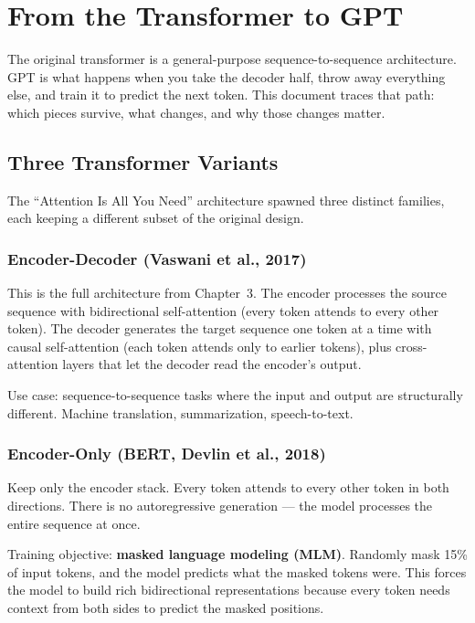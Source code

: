 \chapter{From the Transformer to GPT}

The original transformer is a general-purpose sequence-to-sequence architecture. GPT is what happens when you take the decoder half, throw away everything else, and train it to predict the next token. This document traces that path: which pieces survive, what changes, and why those changes matter.

\section{Three Transformer Variants}

The ``Attention Is All You Need'' architecture spawned three distinct families, each keeping a different subset of the original design.

\subsection{Encoder-Decoder (Vaswani et al., 2017)}

This is the full architecture from Chapter~3. The encoder processes the source sequence with bidirectional self-attention (every token attends to every other token). The decoder generates the target sequence one token at a time with causal self-attention (each token attends only to earlier tokens), plus cross-attention layers that let the decoder read the encoder's output.

Use case: sequence-to-sequence tasks where the input and output are structurally different. Machine translation, summarization, speech-to-text.

\subsection{Encoder-Only (BERT, Devlin et al., 2018)}

Keep only the encoder stack. Every token attends to every other token in both directions. There is no autoregressive generation --- the model processes the entire sequence at once.

Training objective: \textbf{masked language modeling (MLM)}. Randomly mask 15\% of input tokens, and the model predicts what the masked tokens were. This forces the model to build rich bidirectional representations because every token needs context from both sides to predict the masked positions.

